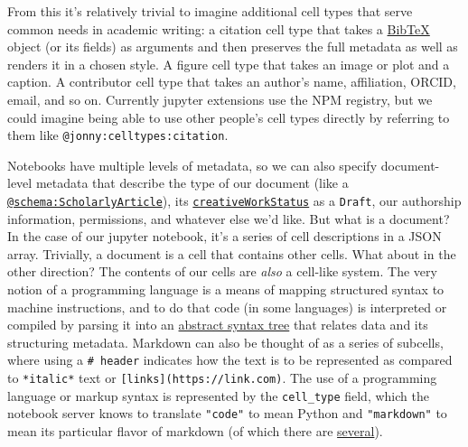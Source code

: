 From this it's relatively trivial to imagine additional cell types that
serve common needs in academic writing: a citation cell type that takes
a \href{http://www.bibtex.org/Format/}{BibTeX} object (or its fields) as
arguments and then preserves the full metadata as well as renders it in
a chosen style. A figure cell type that takes an image or plot and a
caption. A contributor cell type that takes an author's name,
affiliation, ORCID, email, and so on. Currently jupyter extensions use
the NPM registry, but we could imagine being able to use other people's
cell types directly by referring to them like
\texttt{@jonny:celltypes:citation}.

Notebooks have multiple levels of metadata, so we can also specify
document-level metadata that describe the type of our document (like a
\href{https://schema.org/ScholarlyArticle}{\texttt{@schema:ScholarlyArticle}}),
its
\href{https://schema.org/creativeWorkStatus}{\texttt{creativeWorkStatus}}
as a \texttt{Draft}, our authorship information, permissions, and
whatever else we'd like. But what is a document? In the case of our
jupyter notebook, it's a series of cell descriptions in a JSON array.
Trivially, a document is a cell that contains other cells. What about in
the other direction? The contents of our cells are \emph{also} a
cell-like system. The very notion of a programming language is a means
of mapping structured syntax to machine instructions, and to do that
code (in some languages) is interpreted or compiled by parsing it into
an \href{https://en.wikipedia.org/wiki/Abstract_syntax_tree}{abstract
syntax tree} that relates data and its structuring metadata. Markdown
can also be thought of as a series of subcells, where using a
\texttt{\#\ header} indicates how the text is to be represented as
compared to \texttt{*italic*} text or
\texttt{{[}links{]}(https://link.com)}. The use of a programming
language or markup syntax is represented by the \texttt{cell\_type}
field, which the notebook server knows to translate \texttt{"code"} to
mean Python and \texttt{"markdown"} to mean its particular flavor of
markdown (of which there are
\href{https://www.iana.org/assignments/markdown-variants/markdown-variants.xhtml}{several}).

